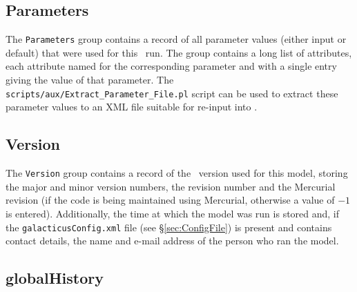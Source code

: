 \subsection{Parameters}

The {\tt Parameters} group contains a record of all parameter values (either input or default) that were used for this \glc\ run. The group contains a long list of attributes, each attribute named for the corresponding parameter and with a single entry giving the value of that parameter. The {\tt scripts/aux/Extract\_Parameter\_File.pl} script can be used to extract these parameter values to an XML file suitable for re-input into \glc.

\subsection{Version}

The {\tt Version} group contains a record of the \glc\ version used for this model, storing the major and minor version numbers, the revision number and the {\sc Mercurial} revision (if the code is being maintained using {\sc Mercurial}, otherwise a value of $-1$ is entered). Additionally, the time at which the model was run is stored and, if the {\tt galacticusConfig.xml} file (see \S\ref{sec:ConfigFile}) is present and contains contact details, the name and e-mail address of the person who ran the model.

\subsection{globalHistory}\label{sec:globalHistory}

